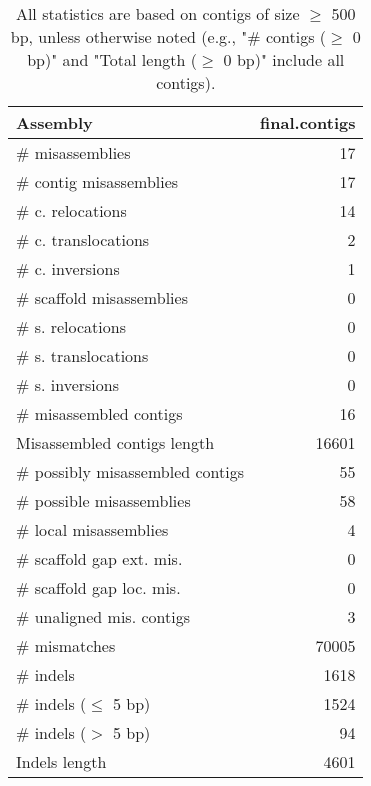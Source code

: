 \documentclass[12pt,a4paper]{article}
\begin{document}
\begin{table}[ht]
\begin{center}
\caption{All statistics are based on contigs of size $\geq$ 500 bp, unless otherwise noted (e.g., "\# contigs ($\geq$ 0 bp)" and "Total length ($\geq$ 0 bp)" include all contigs).}
\begin{tabular}{|l*{1}{|r}|}
\hline
Assembly & final.contigs \\ \hline
\# misassemblies & 17 \\ \hline
\hspace{2mm}\# contig misassemblies & 17 \\ \hline
\hspace{5mm}\# c. relocations & 14 \\ \hline
\hspace{5mm}\# c. translocations & 2 \\ \hline
\hspace{5mm}\# c. inversions & 1 \\ \hline
\hspace{2mm}\# scaffold misassemblies & 0 \\ \hline
\hspace{5mm}\# s. relocations & 0 \\ \hline
\hspace{5mm}\# s. translocations & 0 \\ \hline
\hspace{5mm}\# s. inversions & 0 \\ \hline
\# misassembled contigs & 16 \\ \hline
Misassembled contigs length & 16601 \\ \hline
\# possibly misassembled contigs & 55 \\ \hline
\hspace{5mm}\# possible misassemblies & 58 \\ \hline
\# local misassemblies & 4 \\ \hline
\# scaffold gap ext. mis. & 0 \\ \hline
\# scaffold gap loc. mis. & 0 \\ \hline
\# unaligned mis. contigs & 3 \\ \hline
\# mismatches & 70005 \\ \hline
\# indels & 1618 \\ \hline
\hspace{5mm}\# indels ($\leq$ 5 bp) & 1524 \\ \hline
\hspace{5mm}\# indels ($>$ 5 bp) & 94 \\ \hline
Indels length & 4601 \\ \hline
\end{tabular}
\end{center}
\end{table}
\end{document}
